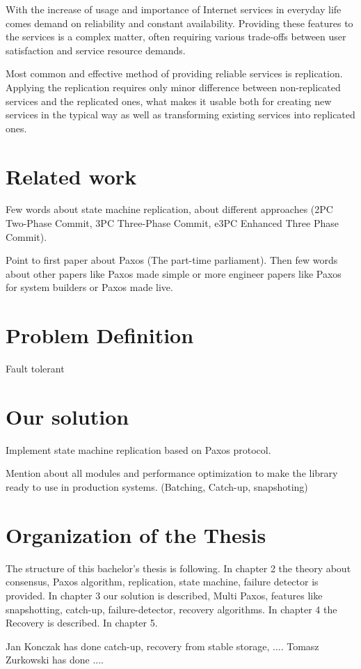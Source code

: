 
With the increase of usage and importance of Internet services in everyday life comes demand on reliability and constant availability.
Providing these features to the services is a complex matter, often requiring various trade-offs between user satisfaction and service resource demands.

Most common and effective method of providing reliable services is replication. Applying the replication requires only minor difference between non-replicated services and the replicated ones, what makes it usable both for creating new services in the typical way %
as well as transforming existing services into replicated ones.



\section{Related work}

Few words about state machine replication, about different approaches (2PC
Two-Phase Commit, 3PC Three-Phase Commit, e3PC Enhanced Three Phase Commit).

Point to first paper about Paxos (The part-time parliament). Then few words about
other papers like Paxos made simple or more engineer papers like Paxos for system
builders or Paxos made live.  

\section{Problem Definition}

Fault tolerant

\section{Our solution}

Implement state machine replication based on Paxos protocol. 

Mention about all modules and performance optimization to make the library ready to use 
in production systems. (Batching, Catch-up, snapshoting)

\section{Organization of the Thesis}
The structure of this bachelor's thesis is following. In chapter 2 the theory about consensus, Paxos algorithm, replication, state machine, failure detector is provided. In chapter 3 our solution is described, Multi Paxos, features like snapshotting, catch-up, failure-detector, recovery algorithms. In chapter 4 the Recovery is described. In chapter 5.

Jan Konczak has done catch-up, recovery from stable storage, ....
Tomasz Zurkowski has done ....
